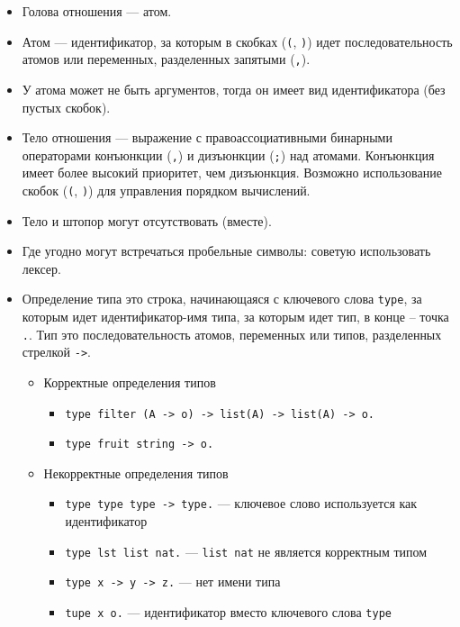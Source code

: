\documentclass[12pt]{article}
\begin{document}
\begin{itemize}
\begin{itemize}
        \item Голова отношения --- атом.
        \item Атом --- идентификатор, за которым в скобках (\verb!(!, \verb!)!) идет последовательность атомов или переменных, разделенных запятыми (\verb!,!).
        \item У атома может не быть аргументов, тогда он имеет вид идентификатора (без пустых скобок).
        \item Тело отношения --- выражение с правоассоциативными бинарными операторами конъюнкции (\verb!,!) и дизъюнкции (\verb!;!) над атомами. Конъюнкция имеет более высокий приоритет, чем дизъюнкция. Возможно использование скобок (\verb!(!, \verb!)!) для управления порядком вычислений.
        \item Тело и штопор могут отсутствовать (вместе).
        \item Где угодно могут встречаться пробельные символы: советую использовать лексер.
        \item Определение типа это строка, начинающаяся с ключевого слова \verb!type!, за которым идет идентификатор-имя типа, за которым идет тип, в конце -- точка \verb!.!. Тип это последовательность атомов, переменных или типов, разделенных стрелкой \verb!->!.
          \begin{itemize}
            \item Корректные определения типов
            \begin{itemize}
              \item \verb!type filter (A -> o) -> list(A) -> list(A) -> o.!
              \item \verb!type fruit string -> o.!
            \end{itemize}
            \item Некорректные определения типов
            \begin{itemize}
              \item \verb!type type type -> type.! --- ключевое слово используется как идентификатор
              \item \verb!type lst list nat.! --- \verb!list nat! не является корректным типом
              \item \verb!type x -> y -> z.! --- нет имени типа
              \item \verb!tupe x o.! --- идентификатор вместо ключевого слова \verb!type!
            \end{itemize}
          \end{itemize}


\end{itemize}
\end{itemize}
\end{document}

